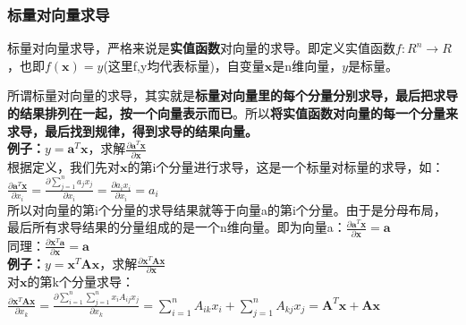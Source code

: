 \documentclass[UTF8]{article}
\begin{document}
    \subsubsection{标量对向量求导}
    标量对向量求导，严格来说是\textbf{实值函数}对向量的求导。即定义实值函数$f: R^{n} \rightarrow R$，也即$f( \bm{x} )=y$(这里f,y均代表标量)，自变量$\bm{x}$是n维向量，$y$是标量。


    所谓标量对向量的求导，其实就是\textbf{标量对向量里的每个分量分别求导，最后把求导的结果排列在一起，按一个向量表示而已}。所以\textbf{将实值函数对向量的每一个分量来求导，最后找到规律，得到求导的结果向量。}
    \\
    \textbf{例子：}$y=\mathbf{a}^{T} \mathbf{x}$，求解$\frac{\partial \mathbf{a}^{T} \mathbf{x}}{\partial \mathbf{x}}$
    \\
    根据定义，我们先对$\bm{x}$的第i个分量进行求导，这是一个标量对标量的求导，如：$\frac{\partial \mathbf{a}^{T} \mathbf{x}}{\partial x_{i}}=\frac{\partial \sum_{j=1}^{n} a_{j} x_{j}}{\partial x_{i}}=\frac{\partial a_{i} x_{i}}{\partial x_{i}}=a_{i}$
    \\
    所以对向量的第i个分量的求导结果就等于向量a的第i个分量。由于是分母布局，最后所有求导结果的分量组成的是一个n维向量。即为向量a：$\frac{\partial \mathbf{a}^{T} \mathbf{x}}{\partial \mathbf{x}}=\mathbf{a}$
    \\
    同理：$\frac{\partial \mathbf{x}^{T} \mathbf{a}}{\partial \mathbf{x}}=\mathbf{a}$
    \\
    \textbf{例子：}$y=\mathbf{x}^{T} \mathbf{A} \mathbf{x}$，求解$\frac{\partial \mathbf{x}^{T} \mathbf{A} \mathbf{x}}{\partial \mathbf{x}}$
    \\
    对$\bm{x}$的第k个分量求导：\\
    $\frac{\partial \mathbf{x}^{T} \mathbf{A} \mathbf{x}}{\partial x_{k}}=\frac{\partial \sum_{i=1}^{n} \sum_{j=1}^{n} x_{i} A_{i j} x_{j}}{\partial x_{k}}=\sum_{i=1}^{n} A_{i k} x_{i}+\sum_{j=1}^{n} A_{k j} x_{j}=\mathbf{A}^{T} \mathbf{x}+\mathbf{A} \mathbf{x}$
\end{document}

